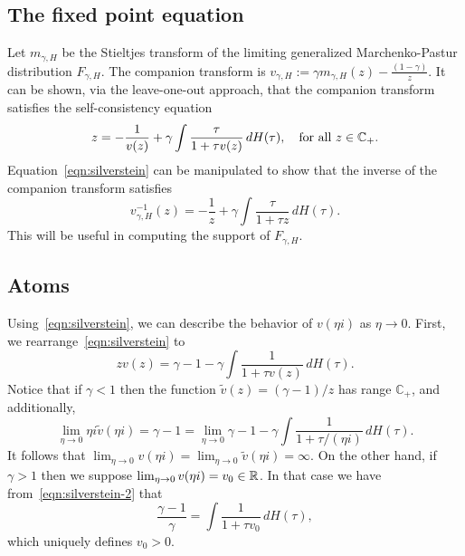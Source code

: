 \documentclass{article}
\newcommand{\Complex}{\mathbb{C}}
\begin{document}
\subsection{The fixed point equation}
Let $m_{\gamma,H}$ be the Stieltjes transform of the limiting generalized Marchenko-Pastur distribution $F_{\gamma,H}$. The companion transform is $v_{\gamma,H} := \gamma m_{\gamma,H}(z) - \frac{(1 - \gamma)}{z}$. It can be shown, via the leave-one-out approach, that the companion transform satisfies the self-consistency equation
\begin{equation}
	\label{eqn:silverstein}
	z = -\frac{1}{v(z)} + \gamma \int \frac{\tau}{1 + \tau v(z)} \,dH(\tau), \quad \textrm{for all $z \in \mathbb{C}_{+}$.}
\end{equation}
Equation~\eqref{eqn:silverstein} can be manipulated to show that the inverse of the companion transform satisfies
\begin{equation}
\label{eqn:inverse-fixed-point}
v_{\gamma,H}^{-1}(z) = -\frac{1}{z} + \gamma\int\frac{\tau}{1 + \tau z} \,dH(\tau). 
\end{equation} 
This will be useful in computing the support of $F_{\gamma,H}$. 

\subsection{Atoms}

Using~\eqref{eqn:silverstein}, we can describe the behavior of $v(\eta i)$ as $\eta \to 0$. First, we rearrange~\eqref{eqn:silverstein} to
\begin{equation}
	\label{eqn:silverstein-2}
	zv(z) = \gamma - 1 - \gamma \int \frac{1}{1 + \tau v(z)} \,dH(\tau).
\end{equation}
Notice that if $\gamma < 1$ then the function $\tilde{v}(z) = (\gamma - 1)/z$ has range $\Complex_{+}$, and additionally, 
$$
\lim_{\eta \to 0} \eta i \tilde{v}(\eta i) = \gamma - 1 = \lim_{\eta \to 0} \gamma - 1 - \gamma \int \frac{1}{1 + \tau/(\eta i)} \,dH(\tau).
$$
It follows that $\lim_{\eta \to 0} v(\eta i) = \lim_{\eta \to 0} \tilde{v}(\eta i) = \infty$. On the other hand, if $\gamma > 1$ then we suppose $\lim_{\eta \to 0} v(\eta i) = v_0 \in \mathbb{R}$. In that case we have from~\eqref{eqn:silverstein-2} that
\begin{equation}
	\label{eqn:stieltjes-at-zero}
	\frac{\gamma - 1}{\gamma} =  \int \frac{1}{1 + \tau v_0} \,dH(\tau),
\end{equation}
which uniquely defines $v_0 > 0$.
\end{document}
